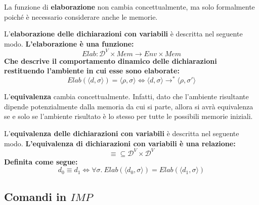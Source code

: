 \documentclass[a4paper]{article}
\begin{document}
 	La funzione di \textbf{elaborazione} non cambia concettualmente, ma solo formalmente poiché è necessario considerare anche le memorie.
 	
 	\begin{boxdef}
 		L'\textcolor{Red3}{\textbf{elaborazione delle dichiarazioni con variabili}} è descritta nel seguente modo. \textbf{L'elaborazione è una funzione:}
 		\begin{equation*}
 			Elab: \mathcal{D}^{V} \times Mem \longrightarrow Env \times Mem
 		\end{equation*}
 		\textbf{Che descrive il comportamento dinamico delle dichiarazioni restituendo l'ambiente in cui esse sono elaborate:}
 		\begin{equation*}
 			Elab\left(\langle d,\sigma \rangle\right) = \langle \rho,\sigma \rangle \iff \langle d,\sigma \rangle \longrightarrow^{*} \langle \rho,\sigma' \rangle
 		\end{equation*}
 	\end{boxdef}\:\newline
 	
 	\noindent
 	L'\textbf{equivalenza} cambia concettualmente. Infatti, dato che l'ambiente risultante dipende potenzialmente dalla memoria da cui si parte, allora si avrà equivalenza se e solo se l'ambiente risultato è lo stesso per tutte le possibili memorie iniziali.
 	
 	\begin{boxdef}
 		L'\textcolor{Red3}{\textbf{equivalenza delle dichiarazioni con variabili}} è descritta nel seguente modo. \textbf{L'equivalenza di dichiarazioni con variabili è una relazione:}
 		\begin{equation*}
 			\equiv \subseteq \mathcal{D}^{V} \times \mathcal{D}^{V}
 		\end{equation*}
 		\textbf{Definita come segue:}
 		\begin{equation*}
 			d_{0} \equiv d_{1} \iff \forall \sigma. \: Elab\left(\langle d_{0},\sigma \rangle\right) = Elab\left(\langle d_{1},\sigma \rangle\right)
 		\end{equation*}
 	\end{boxdef}\newpage
 	
 	\subsection{Comandi in $IMP$}
 	
\end{document}
